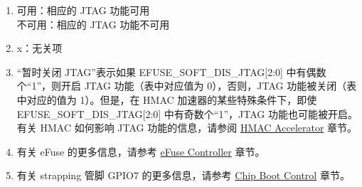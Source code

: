 \begin{tiplisting}
\vspace{-2em}
\begin{enumerate}
\item \label{JTAG footnote: 1}
    可用：相应的 JTAG 功能可用\\
    不可用：相应的 JTAG 功能不可用
\item \label{JTAG footnote: 2}
    x：无关项
\item \label{JTAG footnote: 3}
    “暂时关闭 JTAG”表示如果 EFUSE\_SOFT\_DIS\_JTAG[2:0] 中有偶数个“1”，则开启 JTAG 功能（表中对应值为 0），否则，JTAG 功能被关闭（表中对应的值为 1）。但是，在\chipname{} HMAC 加速器的某些特殊条件下，即使 EFUSE\_SOFT\_DIS\_JTAG[2:0] 中有奇数个“1”，JTAG 功能也可能被开启。
    有关 HMAC 如何影响 JTAG 功能的信息，请参阅 \hyperref[mod:hmac]{HMAC Accelerator} 章节。
\item \label{JTAG footnote: 4}
    有关 eFuse 的更多信息，请参考 \hyperref[mod:efuse]{eFuse Controller} 章节。
\item \label{JTAG footnote: 5}
    有关 strapping 管脚 GPIO7 的更多信息，请参考 \hyperref[mod:bootctrl]{Chip Boot Control} 章节。
\end{enumerate}
\end{tiplisting}